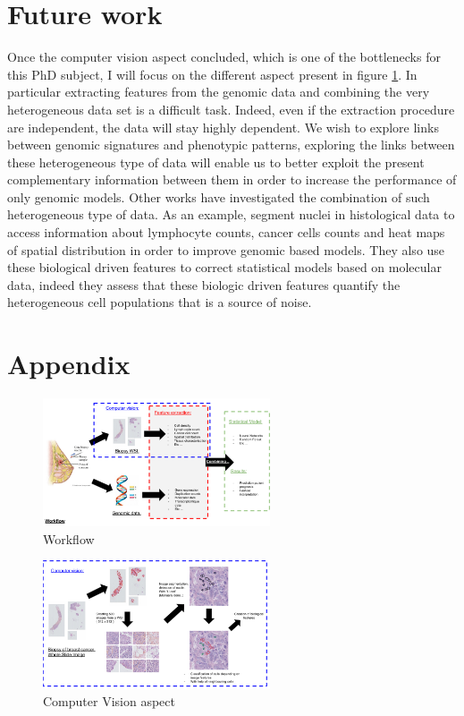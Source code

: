 \documentclass[a4paper,10pt,twocolumn]{article}
\begin{document}
 \section{Future work}
Once the computer vision aspect concluded, which is one of the
bottlenecks for this PhD subject, I will focus on the different aspect
present in figure \ref{workflow1}. In particular extracting features
from the genomic data and combining the very heterogeneous data set is
a difficult task. Indeed, even if the extraction procedure are
independent, the data will stay highly dependent. We wish to explore
links between genomic signatures and phenotypic patterns, exploring
the links between these heterogeneous type of data will enable us to
better exploit the present complementary information between them in
order to increase the performance of only genomic models. Other works
have investigated the combination of such heterogeneous type of
data. As an example, \citet{yuan2012quantitative} segment nuclei in  
 histological data to access information about lymphocyte counts,
 cancer cells counts and heat maps of spatial distribution in order to
 improve genomic based models.  They also use these biological  driven
 features to correct statistical models based on molecular data,
 indeed they assess that  these biologic driven features quantify the
 heterogeneous cell populations that is a source of  noise. 

 

\section*{Appendix}


%
{\footnotesize
}


 \begin{figure}[!ht]
\centering
\includegraphics[width=0.6\textwidth]{Workflow_overview.png}
\caption{Workflow}
\label{workflow1}
\end{figure}


\begin{figure}[!ht]
\centering
\includegraphics[width=0.6\textwidth]{ComputerVision.png}
\caption{Computer Vision aspect}
\label{fig:ComputerVision}
\end{figure}
\end{document}
